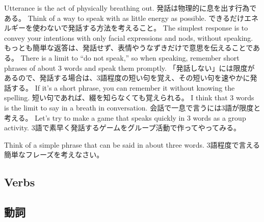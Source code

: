 \documentclass[uplatex,dvipdfmx,b5paper,english,10pt]{jsbook}
\begin{document}
\ifEnglish
Utterance is the act of physically breathing out.
\else
発話は物理的に息を出す行為である。
\fi
\ifEnglish
Think of a way to speak with as little energy as possible.
\else
できるだけエネルギーを使わないで発話する方法を考えること。
\fi
\ifEnglish
The simplest response is to convey your intentions with only facial expressions and nods, without speaking.
\else
もっとも簡単な返答は、発話せず、表情やうなずきだけで意思を伝えることである。
\fi
\ifEnglish
There is a limit to ``do not speak,'' so when speaking, remember short phrases of about 3 words and speak them promptly.
\else
「発話しない」には限度があるので、発話する場合は、3語程度の短い句を覚え、その短い句を速やかに発話する。
\fi
\ifEnglish
If it's a short phrase, you can remember it without knowing the spelling.
\else
短い句であれば、綴を知らなくても覚えられる。
\fi
\ifEnglish
I think that 3 words is the limit to say in a breath in conversation.
\else
会話で一息で言うには3語が限度と考える。
\fi
\ifEnglish
Let's try to make a game that speaks quickly in 3 words as a group activity.
\else
3語で素早く発話するゲームをグループ活動で作ってやってみる。
\fi

\begin{toiquestion}
\ifEnglish
Think of a simple phrase that can be said in about three words.
\else
3語程度で言える簡単なフレーズを考えなさい。
\fi
\end{toiquestion}


\ifEnglish
\subsection{Verbs}
\else
\subsection{動詞}
\fi
\end{document}
